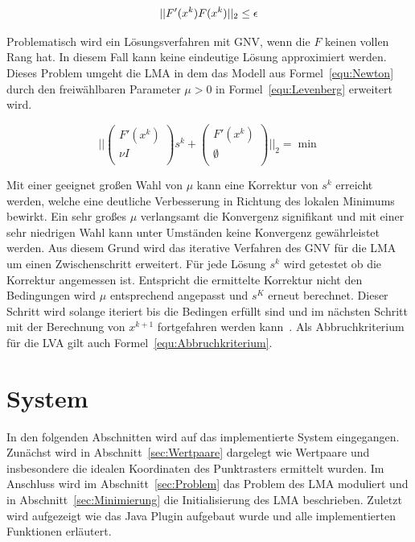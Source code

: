 \begin{equation}
\label{equ:Abbruchkriterium}
||F'(x^k)F(x^k)||_2 \leq \epsilon\\
\end{equation}

Problematisch wird ein Lösungsverfahren mit GNV, wenn die $F$ keinen vollen Rang hat. In diesem Fall kann keine eindeutige Lösung approximiert werden. Dieses Problem umgeht die LMA in dem das Modell aus Formel~\ref{equ:Newton} durch den freiwählbaren Parameter $\mu>0$ in Formel~\ref{equ:Levenberg} erweitert wird. 

\begin{equation}
\label{equ:Levenberg}
||
\begin{pmatrix}
F'(x^k)\\\nu I\\
\end{pmatrix}
s^k+\begin{pmatrix}
F'(x^k)\\\emptyset\\
\end{pmatrix}||_2 = \min
\end{equation}

Mit einer geeignet großen Wahl von $\mu$ kann eine Korrektur von $s^k$ erreicht werden, welche eine deutliche Verbesserung in Richtung des lokalen Minimums bewirkt. Ein sehr großes $\mu$ verlangsamt die Konvergenz signifikant und mit einer sehr niedrigen Wahl kann unter Umständen keine Konvergenz gewährleistet werden. Aus diesem Grund wird das iterative Verfahren des GNV für die LMA um einen Zwischenschritt erweitert. Für jede Lösung $s^k$ wird getestet ob die Korrektur angemessen ist. Entspricht die ermittelte Korrektur nicht den Bedingungen wird $\mu$ entsprechend angepasst und $s^K$ erneut berechnet. Dieser Schritt wird solange iteriert bis die Bedingen erfüllt sind und im nächsten Schritt mit der Berechnung von $x^{k+1}$ fortgefahren werden kann~\cite{dahmen2008numerik}. Als Abbruchkriterium für die LVA gilt auch Formel~\ref{equ:Abbruchkriterium}.

 

\section{System}

In den folgenden Abschnitten wird auf das implementierte System eingegangen. Zunächst wird in Abschnitt~\ref{sec:Wertpaare} dargelegt wie Wertpaare und insbesondere die idealen Koordinaten des Punktrasters ermittelt wurden. Im Anschluss wird im Abschnitt~\ref{sec:Problem} das Problem des LMA moduliert und in Abschnitt~\ref{sec:Minimierung} die Initialisierung des LMA beschrieben. Zuletzt wird aufgezeigt wie das Java Plugin aufgebaut wurde und alle implementierten Funktionen erläutert.



